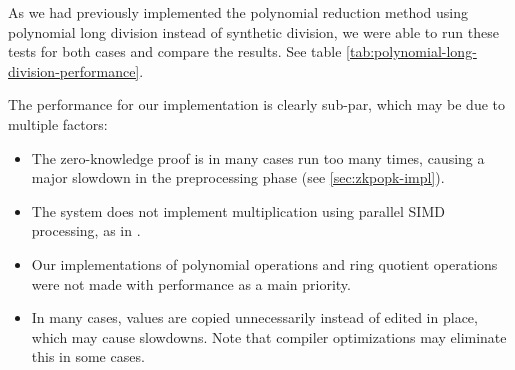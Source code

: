 \documentclass[../main.tex]{subfiles}
\begin{document}
As we had previously implemented the polynomial reduction method using polynomial long division instead of synthetic division, we were able to run these tests for both cases and compare the results. See table \ref{tab:polynomial-long-division-performance}.

The performance for our implementation is clearly sub-par, which may be due to multiple factors:
\begin{itemize}
    \item The zero-knowledge proof is in many cases run too many times, causing a major slowdown in the preprocessing phase (see \ref{sec:zkpopk-impl}).
    \item The system does not implement multiplication using parallel SIMD processing, as in \cite{damgaard2012multiparty}.
    \item Our implementations of polynomial operations and ring quotient operations were not made with performance as a main priority.
    \item In many cases, values are copied unnecessarily instead of edited in place, which may cause slowdowns. Note that compiler optimizations may eliminate this in some cases.
\end{itemize}
\end{document}
